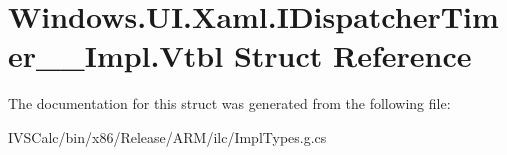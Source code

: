 \hypertarget{struct_windows_1_1_u_i_1_1_xaml_1_1_i_dispatcher_timer_____impl_1_1_vtbl}{}\section{Windows.\+U\+I.\+Xaml.\+I\+Dispatcher\+Timer\+\_\+\+\_\+\+Impl.\+Vtbl Struct Reference}
\label{struct_windows_1_1_u_i_1_1_xaml_1_1_i_dispatcher_timer_____impl_1_1_vtbl}


The documentation for this struct was generated from the following file\+:\begin{DoxyCompactItemize}
\item 
I\+V\+S\+Calc/bin/x86/\+Release/\+A\+R\+M/ilc/Impl\+Types.\+g.\+cs\end{DoxyCompactItemize}
